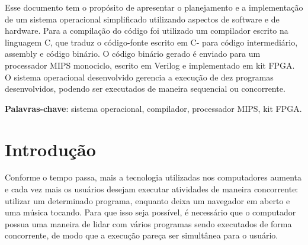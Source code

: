 \documentclass[
	12pt,				%
	oneside,
	a4paper,			%
	english,			%
	french,				%
	spanish,			%
	brazil,				%
	]{abntex2}
\begin{document}

\frenchspacing 






\imprimircapa

\imprimirfolhaderosto*

\setlength{\absparsep}{18pt} %
\begin{resumo}
 
Esse documento tem o propósito de apresentar o planejamento e a implementação de um sistema operacional simplificado utilizando aspectos de software e de hardware. Para a compilação do código foi utilizado um compilador escrito na linguagem C, que traduz o código-fonte escrito em C- para código intermediário, assembly e código binário. O código binário gerado é enviado para um processador MIPS monociclo, escrito em Verilog e implementado em kit FPGA. O sistema operacional desenvolvido gerencia a execução de dez programas desenvolvidos, podendo ser executados de maneira sequencial ou concorrente.

\noindent
\textbf{Palavras-chave}: sistema operacional, compilador, processador MIPS, kit FPGA.
\end{resumo}

\listoffigures*
\clearpage

\listoftables*
\clearpage

\tableofcontents*
\clearpage

\textual

\chapter{Introdução}
Conforme o tempo passa, mais a tecnologia utilizadas nos computadores aumenta e cada vez mais os usuários desejam executar atividades de maneira concorrente: utilizar um determinado programa, enquanto deixa um navegador em aberto e uma música tocando. Para que isso seja possível, é necessário que o computador possua uma maneira de lidar com vários programas sendo executados de forma concorrente, de modo que a execução pareça ser simultânea para o usuário.
\end{document}

